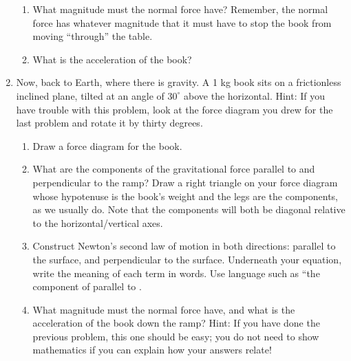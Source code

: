 \documentclass[12pt]{article}
\begin{document}
\begin{enumerate}
\begin{enumerate}
\item{What magnitude must the normal force have? Remember, the normal force has
 	whatever magnitude that it must have to stop the book from moving ``through''
 	the table.}
\item{What is the acceleration of the book?}
\end{enumerate}



\item{Now, back to Earth, where there is gravity. A 1 kg book sits on a frictionless inclined
 	plane, tilted at an angle of $30^\circ$ above the horizontal. Hint: If you have trouble with
 	this problem, look at the force diagram you drew for the last problem and rotate it by
 	thirty degrees. }
\begin{enumerate}
\item{Draw a force diagram for the book. }
\item{What are the components of the gravitational force parallel to and perpendicular
 	to the ramp? Draw a right triangle on your force diagram whose hypotenuse is
 	the book’s weight and the legs are the components, as we usually do. Note that
 	the components will both be diagonal relative to the horizontal/vertical axes. }
\item Construct Newton's second law of motion in both directions: parallel to the surface, and perpendicular to the surface. 
Underneath your equation, write the meaning of each term in words. Use language such as ``the component of \underline{\hspace{0.5in}} parallel to \underline{\hspace{0.5in}}.
\item{What magnitude must the normal force have, and what is the acceleration of the book down the ramp? Hint: If you have done the
 	previous problem, this one should be easy; you do not need to show mathematics
 	if you can explain how your answers relate!}
\end{enumerate}
 


\end{enumerate}
\end{document}
